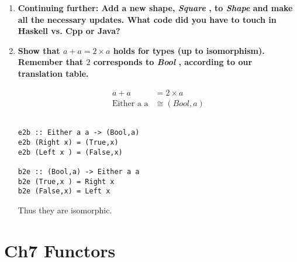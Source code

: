 \documentclass{article}
\begin{document}
\begin{enumerate}
	\item \textbf{Continuing further: Add a new shape, \textit{Square} , to \textit{Shape} and make all the necessary updates. What code did you have to touch in Haskell vs. Cpp or Java? }

	\item \textbf{Show that $ a + a = 2 \times a $ holds for types (up to isomorphism). Remember that $ 2 $ corresponds to \textit{Bool} , according to our translation table.}

	      \begin{align*}
		      a + a             & = 2 \times a   \\
		      \text{Either a a} & \cong (Bool,a)
	      \end{align*}

	      \begin{verbatim}
	      	
e2b :: Either a a -> (Bool,a)
e2b (Right x) = (True,x)
e2b (Left x ) = (False,x)

b2e :: (Bool,a) -> Either a a
b2e (True,x ) = Right x
b2e (False,x) = Left x
	      \end{verbatim}

	      Thus they are isomorphic.

\end{enumerate}

\section{Ch7 Functors}
\end{document}
